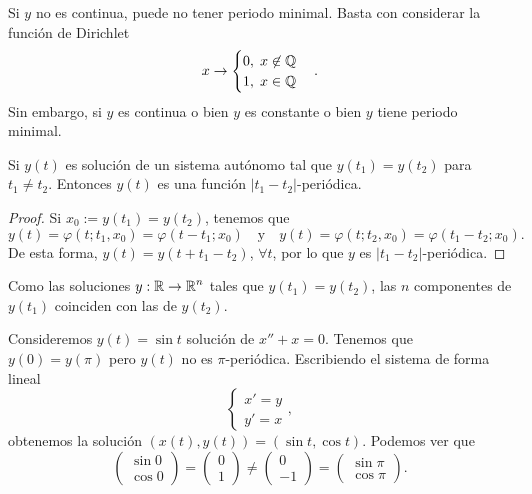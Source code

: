 \begin{observation}
Si $\displaystyle y $ no es continua, puede no tener periodo minimal. Basta con considerar la función de Dirichlet
\[x \to 
\begin{cases}
0, \; x \not\in \mathbb{Q} \\
1, \; x \in \mathbb{Q}
\end{cases}
.\]
Sin embargo, si $\displaystyle y $ es continua o bien $\displaystyle y $ es constante o bien $\displaystyle y $ tiene periodo minimal. 
\end{observation}
\begin{prop}
Si $\displaystyle y\left(t\right) $ es solución de un sistema autónomo tal que $\displaystyle y\left(t_{1}\right)=y\left(t_{2}\right) $ para $\displaystyle t_{1}\neq t_{2} $. Entonces $\displaystyle y\left(t\right) $ es una función $\displaystyle \left|t_{1}-t_{2}\right| $-periódica.
\end{prop}
\begin{proof}
Si $\displaystyle x_{0}:=y\left(t_{1}\right)=y\left(t_{2}\right) $, tenemos que 
\[y\left(t\right)=\varphi\left(t; t_{1}, x_{0}\right)=\varphi\left(t-t_{1}; x_{0}\right)\quad \text{y} \quad y\left(t\right)=\varphi\left(t; t_{2}, x_{0}\right)=\varphi\left(t_{1}-t_{2}; x_{0}\right) .\]
De esta forma, $\displaystyle y\left(t\right)=y\left(t+t_{1}-t_{2}\right) $, $\displaystyle \forall t  $, por lo que $\displaystyle y $ es $\displaystyle \left|t_{1}-t_{2}\right| $-periódica. 
\end{proof}
\begin{observation}
Como las soluciones $\displaystyle y : \mathbb{R} \to \mathbb{R}^{n} $ tales que $\displaystyle y\left(t_{1}\right)=y\left(t_{2}\right) $, las $\displaystyle n $ componentes de $\displaystyle y\left(t_{1}\right) $ coinciden con las de $\displaystyle y\left(t_{2}\right) $.
\end{observation}
\begin{eg}
Consideremos $\displaystyle y\left(t\right)=\sin t $ solución de $\displaystyle x'' + x = 0 $. Tenemos que $\displaystyle y\left(0\right)=y\left(\pi \right) $ pero $\displaystyle y\left(t\right) $ no es $\displaystyle \pi  $-periódica. Escribiendo el sistema de forma lineal
\[
\begin{cases}
x' = y\\
y' = x
\end{cases}
,\]
obtenemos la solución $\displaystyle \left(x\left(t\right), y\left(t\right)\right)=\left(\sin t, \cos t\right) $. Podemos ver que 
\[\begin{pmatrix} \sin 0 \\ \cos 0  \end{pmatrix}=\begin{pmatrix} 0 \\ 1 \end{pmatrix}\neq \begin{pmatrix} 0 \\ - 1 \end{pmatrix}=\begin{pmatrix} \sin \pi \\ \cos \pi \end{pmatrix} .\]
\end{eg}
